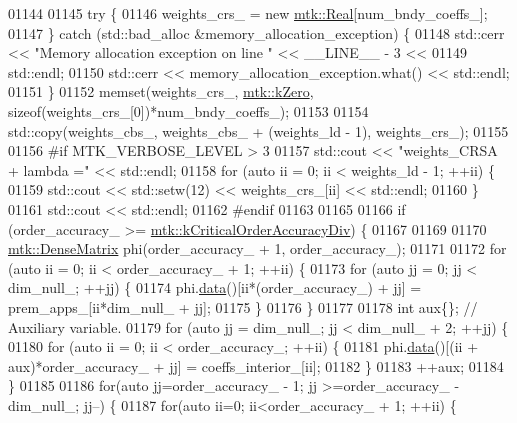 \begin{DoxyCode}
{{01144 
01145   \textcolor{keywordflow}{try} \{
01146     weights\_crs\_ = \textcolor{keyword}{new} \hyperlink{group__c01-roots_gac080bbbf5cbb5502c9f00405f894857d}{mtk::Real}[num\_bndy\_coeffs\_];
01147   \} \textcolor{keywordflow}{catch} (std::bad\_alloc &memory\_allocation\_exception) \{
01148     std::cerr << \textcolor{stringliteral}{"Memory allocation exception on line "} << \_\_LINE\_\_ - 3 <<
01149       std::endl;
01150     std::cerr << memory\_allocation\_exception.what() << std::endl;
01151   \}
01152   memset(weights\_crs\_, \hyperlink{group__c01-roots_ga59a451a5fae30d59649bcda274fea271}{mtk::kZero}, \textcolor{keyword}{sizeof}(weights\_crs\_[0])*num\_bndy\_coeffs\_);
01153 
01154   std::copy(weights\_cbs\_, weights\_cbs\_ + (weights\_ld - 1), weights\_crs\_);
01155 
01156 \textcolor{preprocessor}{  #if MTK\_VERBOSE\_LEVEL > 3}
01157   std::cout << \textcolor{stringliteral}{"weights\_CRSA + lambda ="} << std::endl;
01158   \textcolor{keywordflow}{for} (\textcolor{keyword}{auto} ii = 0; ii < weights\_ld - 1; ++ii) \{
01159     std::cout << std::setw(12) << weights\_crs\_[ii] << std::endl;
01160   \}
01161   std::cout << std::endl;
01162 \textcolor{preprocessor}{  #endif}
01163 
01165 
01166   \textcolor{keywordflow}{if} (order\_accuracy\_ >= \hyperlink{group__c01-roots_ga0898eef2108473e44a5223932d571c31}{mtk::kCriticalOrderAccuracyDiv}) \{
01167 
01169 
01170     \hyperlink{classmtk_1_1DenseMatrix}{mtk::DenseMatrix} phi(order\_accuracy\_ + 1, order\_accuracy\_);
01171 
01172     \textcolor{keywordflow}{for} (\textcolor{keyword}{auto} ii = 0; ii < order\_accuracy\_ + 1; ++ii) \{
01173       \textcolor{keywordflow}{for} (\textcolor{keyword}{auto} jj = 0; jj < dim\_null\_; ++jj) \{
01174         phi.\hyperlink{classmtk_1_1DenseMatrix_a0c33b8a9e01d157c61ddbdf807c25d84}{data}()[ii*(order\_accuracy\_) + jj] = prem\_apps\_[ii*dim\_null\_ + jj];
01175       \}
01176     \}
01177 
01178     \textcolor{keywordtype}{int} aux\{\};  \textcolor{comment}{// Auxiliary variable.}
01179     \textcolor{keywordflow}{for} (\textcolor{keyword}{auto} jj = dim\_null\_; jj < dim\_null\_ + 2; ++jj) \{
01180       \textcolor{keywordflow}{for} (\textcolor{keyword}{auto} ii = 0; ii < order\_accuracy\_; ++ii) \{
01181         phi.\hyperlink{classmtk_1_1DenseMatrix_a0c33b8a9e01d157c61ddbdf807c25d84}{data}()[(ii + aux)*order\_accuracy\_ + jj] = coeffs\_interior\_[ii];
01182       \}
01183       ++aux;
01184     \}
01185 
01186     \textcolor{keywordflow}{for}(\textcolor{keyword}{auto} jj=order\_accuracy\_ - 1; jj >=order\_accuracy\_ - dim\_null\_; jj--) \{
01187       \textcolor{keywordflow}{for}(\textcolor{keyword}{auto} ii=0; ii<order\_accuracy\_ + 1; ++ii) \{
}}
\end{DoxyCode}
